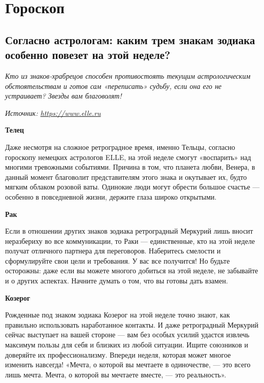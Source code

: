 \chapter{Гороскоп}

\section{Согласно астрологам: каким трем знакам зодиака особенно повезет на этой неделе?}

\textit{Кто из знаков-храбрецов способен противостоять текущим астрологическим обстоятельствам и готов сам «переписать» судьбу, если она его не устраивает? Звезды вам благоволят!}

\textit{Источник: \url{https://www.elle.ru}}

\textbf{Телец}

Даже несмотря на сложное ретроградное время, именно Тельцы, согласно гороскопу немецких астрологов ELLE, на этой неделе смогут «воспарить» над многими тревожными событиями. Причина в том, что планета любви, Венера, в данный момент благоволит представителям этого знака и окутывает их, будто мягким облаком розовой ваты. Одинокие люди могут обрести большое счастье — особенно в повседневной жизни, держите глаза широко открытыми.

\textbf{Рак}

Если в отношении других знаков зодиака ретроградный Меркурий лишь вносит неразбериху во все коммуникации, то Раки — единственные, кто на этой неделе получат отличного партнера для переговоров. Наберитесь смелости и сформулируйте свои цели и требования. У вас все получится! Но будьте осторожны: даже если вы можете многого добиться на этой неделе, не забывайте и о других аспектах. Начните думать о том, что вы готовы дать взамен.

\textbf{Козерог}

Рожденные под знаком зодиака Козерог на этой неделе точно знают, как правильно использовать наработанное контакты. И даже ретроградный Меркурий сейчас выступает на вашей стороне — вам без особых усилий удастся извлечь максимум пользы для себя и близких из любой ситуации. Ищите союзников и доверяйте их профессионализму. Впереди неделя, которая может многое изменить навсегда! «Мечта, о которой вы мечтаете в одиночестве, — это всего лишь мечта. Мечта, о которой вы мечтаете вместе, — это реальность».



